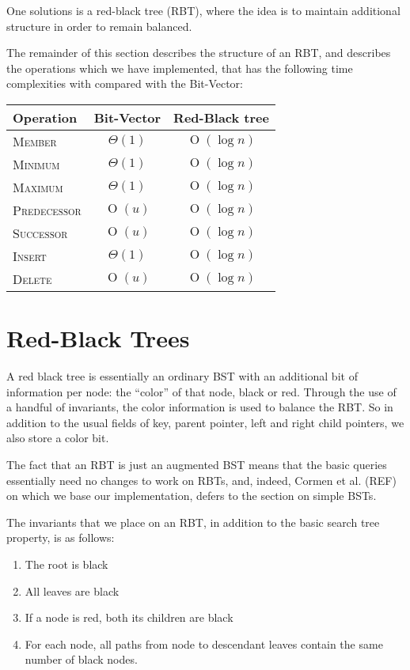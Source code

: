 \documentclass[oneside,11pt,openright]{report}
\newcommand{\BigO}[1]{\ensuremath{\operatorname{O}\left(#1\right)}}
\newcommand{\BigT}[1]{\ensuremath{\Theta\left(#1\right)}}
\newcommand{\Insert}{\textsc{Insert}}
\newcommand{\Delete}{\textsc{Delete}}
\newcommand{\Member}{\textsc{Member}}
\newcommand{\Minimum}{\textsc{Minimum}}
\newcommand{\Maximum}{\textsc{Maximum}}
\newcommand{\Predecessor}{\textsc{Predecessor}}
\newcommand{\Successor}{\textsc{Successor}}
\begin{document}
One solutions is a red-black tree (RBT), where the idea is to maintain
additional structure in order to remain balanced.

The remainder of this section describes the structure of an RBT, and
describes the operations which we have implemented, that has the following time complexities with compared with the Bit-Vector:

\begin{center}
  \begin{tabular}{ l | c | c}
    Operation & Bit-Vector & Red-Black tree \\ \hline
    \Member & $\BigT{1}$ & $\BigO{\log n}$ \\ 
    \Minimum & $\BigT{1}$ & $\BigO{\log n}$ \\ 
    \Maximum & $\BigT{1}$ & $\BigO{\log n}$ \\ 
    \Predecessor & $\BigO{u}$ & $\BigO{\log n}$ \\ 
    \Successor & $\BigO{u}$ & $\BigO{\log n}$ \\ 
    \Insert & $\BigT{1}$ & $\BigO{\log n}$ \\ 
    \Delete & $\BigO{u}$ & $\BigO{\log n}$ \\
  \end{tabular}
\end{center}


\section{Red-Black Trees}\label{sec:rbt}

A red black tree is essentially an ordinary BST with an additional bit
of information per node: the ``color'' of that node, black or
red. Through the use of a handful of invariants, the color information
is used to balance the RBT. So in addition to the usual fields of key,
parent pointer, left and right child pointers, we also store a color
bit.

The fact that an RBT is just an augmented BST means that the basic
queries essentially need no changes to work on RBTs, and, indeed,
Cormen et al. (REF) on which we base our implementation, defers to the
section on simple BSTs.

The invariants that we place on an RBT, in addition to the basic
search tree property, is as follows:

\begin{enumerate}
  \item The root is black
  \item All leaves are black
  \item If a node is red, both its children are black
  \item For each node, all paths from node to descendant leaves
    contain the same number of black nodes.
\end{enumerate}
\end{document}
